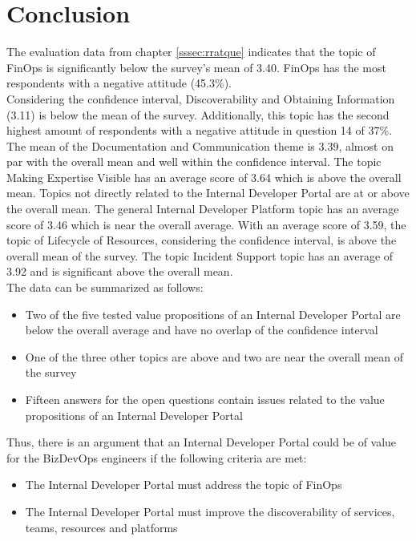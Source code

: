 \documentclass[a4paper,10pt]{article}
\begin{document}
    \section{Conclusion}
    \label{sec:conclusion}
    The evaluation data from chapter \ref{sssec:rratque} indicates that the topic of FinOps is significantly below the
    survey's mean of 3.40.
    FinOps has the most respondents with a negative attitude (45.3\%).\\
    Considering the confidence interval, Discoverability and Obtaining Information (3.11) is below the mean of the survey.
    Additionally, this topic has the second highest amount of respondents with a negative attitude in question 14 of 37\%.\\
    The mean of the Documentation and Communication theme is 3.39, almost on par with the overall mean and well within the
    confidence interval.
    The topic Making Expertise Visible has an average score of 3.64 which is above the overall mean.
    Topics not directly related to the Internal Developer Portal are at or above the overall mean.
    The general Internal Developer Platform topic has an average score of 3.46 which is near the overall average.
    With an average score of 3.59, the topic of Lifecycle of Resources, considering the confidence interval, is above
    the overall mean of the survey.
    The topic Incident Support topic has an average of 3.92 and is significant above the overall mean.\\
    The data can be summarized as follows:
    \begin{itemize}
        \item Two of the five tested value propositions of an Internal Developer Portal are below the overall average and have no overlap of the confidence interval
        \item One of the three other topics are above and two are near the overall mean of the survey
        \item Fifteen answers for the open questions contain issues related to the value propositions of an Internal Developer Portal
    \end{itemize}
    Thus, there is an argument that an Internal Developer Portal could be of value for the BizDevOps engineers if the following
    criteria are met:
    \begin{itemize}
        \item The Internal Developer Portal must address the topic of FinOps
        \item The Internal Developer Portal must improve the discoverability of services, teams, resources and platforms
    \end{itemize}
\end{document}
